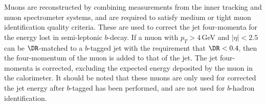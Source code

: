 Muons are reconstructed by combining measurements from the inner tracking and muon spectrometer systems, and are required to satisfy medium or tight muon identification quality criteria. %
These are used to correct the jet four-momenta for the energy lost in semi-leptonic $b$-decay. If a muon with $p_{T} > 4$\,GeV and $|\eta | < 2.5$ can be $\DR$-matched to a $b$-tagged jet with the requirement that $\DR < 0.4$, then the four-momentum of the muon is added to that of the jet. The jet four-momenta is corrected, excluding the expected energy deposited by the muon in the calorimeter. It should be noted that these muons are only used for corrected the jet energy after $b$-tagged has been performed, and are not used for $b$-hadron identification.

